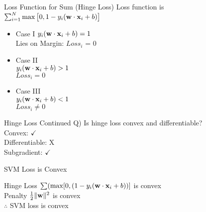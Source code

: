 \documentclass{beamer}
\begin{document}
	\begin{frame}{Loss Function for Sum (Hinge Loss)}
		Loss function is $\sum_{i=1}^{N}\max\big[0, 1 - y_{i}(\mathbf{w} \cdot \mathbf{x}_{i} + b)\big]$ \\
		\begin{itemize}[<+->]
			\item Case I 
			\hspace{0.5cm} $y_{i}(\mathbf{w} \cdot \mathbf{x}_{i} + b) = 1$ \\
			
			Lies on Margin: $Loss_{i}$ = 0 \\
		
			\item Case II \\
			\hspace{0.5cm} $y_{i}(\mathbf{w} \cdot \mathbf{x}_{i} + b) > 1$ \\
			$Loss_{i} = 0$ \\ 
			
			\item 	Case III \\
			\hspace{0.5cm} $y_{i}(\mathbf{w} \cdot \mathbf{x}_{i} + b) < 1$ \\
			$Loss_{i} \neq 0$
		\end{itemize}
		
		
	
	\end{frame}
	\begin{frame}{Hinge Loss Continued}
		Q) Is hinge loss convex and differentiable? \\
		\hspace{0.5cm}Convex: $\checkmark$ \\
		\hspace{0.5cm}Differentiable: X\\
		\hspace{0.5cm}Subgradient: $\checkmark$
	\end{frame}
	\begin{frame}{SVM Loss is Convex}
		
		Hinge Loss $\sum(\max[0, (1-y_{i}(\mathbf{w} \cdot \mathbf{x}_{i}+b))]$ is convex \\
		\vspace{1cm}
		Penalty $\frac{1}{2}\|\mathbf{w}\|^{2}$ is convex \\
		\vspace{1cm}
		$\therefore$ SVM loss is convex
	\end{frame}
	
\end{document}
